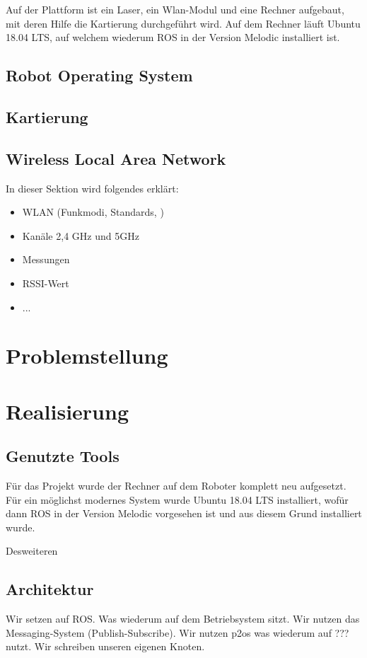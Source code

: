 \documentclass{scrartcl}%
\begin{document}
Auf der Plattform ist ein Laser, ein Wlan-Modul und eine Rechner aufgebaut, mit deren Hilfe die Kartierung durchgeführt wird. Auf dem Rechner läuft Ubuntu 18.04 LTS, auf welchem wiederum ROS in der Version Melodic installiert ist.
\subsection{Robot Operating System}
\subsection{Kartierung}

\subsection{Wireless Local Area Network}
In dieser Sektion wird folgendes erklärt:
\begin{itemize}
	\item WLAN (Funkmodi, Standards, )
	\item Kanäle 2,4 GHz und 5GHz
	\item Messungen
	\item RSSI-Wert
	\item ...
\end{itemize}


\section{Problemstellung}

\section{Realisierung}
\subsection{Genutzte Tools}
Für das Projekt wurde der Rechner auf dem Roboter komplett neu aufgesetzt. Für ein möglichst modernes System wurde Ubuntu 18.04 LTS installiert, wofür dann ROS in der Version Melodic vorgesehen ist und aus diesem Grund installiert wurde.

Desweiteren 


\subsection{Architektur}
Wir setzen auf ROS. Was wiederum auf dem Betriebsystem sitzt. Wir nutzen das Messaging-System (Publish-Subscribe). Wir nutzen p2os was wiederum auf ??? nutzt. Wir schreiben unseren eigenen Knoten.
\end{document}
